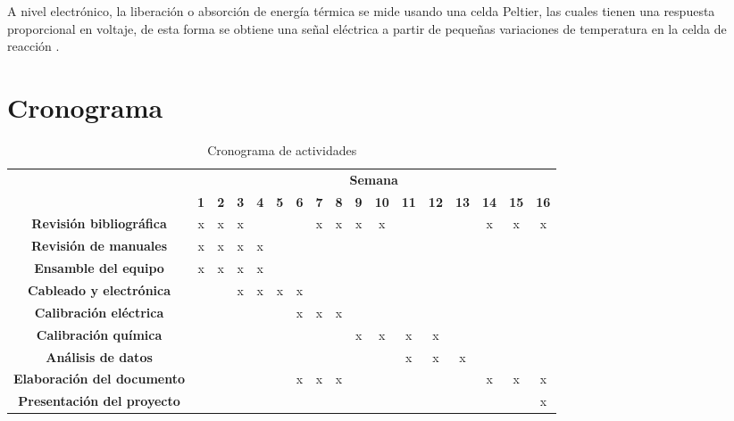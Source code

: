 	A nivel electrónico, la liberación o absorción de energía térmica se mide usando una celda Peltier, las cuales tienen una respuesta proporcional en voltaje, de esta forma se obtiene una señal eléctrica a partir de pequeñas variaciones de temperatura en la celda de reacción \cite{Suurkuusk}.
	
\newpage

\section{Cronograma}
	\begin{table}[h]
		\centering
		\caption{Cronograma de actividades}
		\label{tb: cronograma}
		\footnotesize
		\begin{tabular}{|c|c|c|c|c|c|c|c|c|c|c|c|c|c|c|c|c|}
			\hline
			\rowcolor[HTML]{C0C0C0} 
			\cellcolor[HTML]{C0C0C0}                                       & \multicolumn{16}{c|}{\cellcolor[HTML]{C0C0C0}\textbf{Semana}} \\ \cline{2-17} 
			\rowcolor[HTML]{EFEFEF} 
			\multirow{-2}{*}{\cellcolor[HTML]{C0C0C0}\textbf{Actividades}} & \textbf{1} & \textbf{2} & \textbf{3} & \textbf{4} & \textbf{5} & \textbf{6} & \textbf{7} & \textbf{8} & \textbf{9} & \textbf{10} & \textbf{11} & \textbf{12} & \textbf{13} & \textbf{14} & \textbf{15} & \textbf{16} \\ \hline
			\cellcolor[HTML]{EFEFEF}
			\textbf{Revisión bibliográfica} & x & x & x & & & & x & x & x & x & & & & x & x & x \\ \hline
			\cellcolor[HTML]{EFEFEF}\textbf{Revisión de manuales} & x & x & x & x & & & & & & & & & & & & \\ \hline
			\cellcolor[HTML]{EFEFEF}\textbf{Ensamble del equipo} & x & x & x & x & & & & & & & & & & & & \\ \hline
			\cellcolor[HTML]{EFEFEF}\textbf{Cableado y electrónica} & & & x & x & x & x & & & & & & & & & & \\ \hline
			\cellcolor[HTML]{EFEFEF}\textbf{Calibración eléctrica} & & & & & & x & x & x & & & & & & & & \\ \hline
			\cellcolor[HTML]{EFEFEF}\textbf{Calibración química} & & & & & & & & & x & x & x & x & & & & \\ \hline
			\cellcolor[HTML]{EFEFEF}\textbf{Análisis de datos} & & & & & & & & & & & x & x & x & & & \\ \hline
			\cellcolor[HTML]{EFEFEF}\textbf{Elaboración del documento} & & & & & & x & x & x & & & & & & x & x & x \\ \hline
			\cellcolor[HTML]{EFEFEF}\textbf{Presentación del proyecto} & & & & & & & & & & & & & & & & x \\ \hline
		\end{tabular}
	\end{table}

